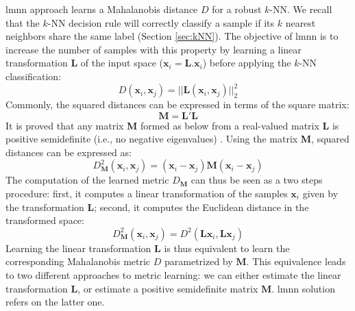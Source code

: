 {\sc lmnn} approach learns a Mahalanobis distance $D$ for a robust $k$-NN. We recall that the $k$-NN decision rule will correctly classify a sample if its $k$ nearest neighbors share the same label (Section \ref{sec:kNN}). 
The objective of {\sc lmnn} is to increase the number of samples with this property by learning a linear transformation $\textbf{L}$ of the input space ($\textbf{x}_i=\textbf{L}.\textbf{x}_i$) before applying the $k$-NN classification:
\begin{equation}
	D(\textbf{x}_i,\textbf{x}_j) = ||\textbf{L}(\textbf{x}_i,\textbf{x}_j)||_2^2
	\label{eq:lin}
\end{equation}
Commonly, the squared distances can be expressed in terms of the square matrix:
\begin{equation}
\textbf{M} = \textbf{L}'\textbf{L}
\end{equation}
It is proved that any matrix \textbf{M} formed as below from a real-valued matrix \textbf{L} is positive semidefinite (i.e., no negative eigenvalues) \cite{Weinberger2009}. Using the matrix \textbf{M}, squared distances can be expressed as:
\begin{equation}
D^2_\textbf{M}(\textbf{x}_i,\textbf{x}_j) = (\textbf{x}_i-\textbf{x}_j)\textbf{M}(\textbf{x}_i-\textbf{x}_j)
\end{equation}
\noindent The computation of the learned metric $D_\textbf{M}$ can thus be seen as a two steps procedure: first, it computes a linear transformation of the samples $\textbf{x}_i$ given by the transformation $\textbf{L}$; second, it computes the Euclidean distance in the transformed space:
\begin{equation}
D^2_\textbf{M}(\textbf{x}_i,\textbf{x}_j) = D^2(\textbf{L} \textbf{x}_i,\textbf{L} \textbf{x}_j)
\end{equation}
Learning the linear transformation $\textbf{L}$ is thus equivalent to learn the corresponding Mahalanobis metric $D$ parametrized by $\textbf{M}$. This equivalence leads to two different approaches to metric learning: we can either estimate the linear transformation $\textbf{L}$, or estimate a positive semidefinite matrix $\textbf{M}$. {\sc lmnn} solution refers on the latter one.




